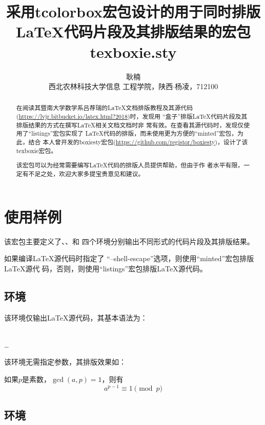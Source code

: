 \documentclass{ctexart}
\title{\Large \heiti 采用tcolorbox宏包设计的用于同时排版\LaTeX 代码片段及其排版结果的宏包texboxie.sty}
\author{\zihao{4} \fangsong 耿楠\\\small \songti 西北农林科技大学信息
  工程学院，陕西$\cdot$杨凌，712100}
\newcommand{\qtmark}[1]{``#1''}
\begin{document}

\maketitle

\begin{abstract}
  在阅读其暨南大学数学系吕荐瑞的\LaTeX 文档排版教程及其源代码
  (\url{https://lvjr.bitbucket.io/latex.html?2018})时，发现用
  \qtmark{盒子}排版\LaTeX 代码片段及其排版结果的方式在撰写\LaTeX 相关文档文档时非
  常有效。在查看其源代码时，发现仅使用了\qtmark{listings}宏包实现了
  \LaTeX 代码的排版，而未使用更为方便的\qtmark{minted}宏包，为此，结合
  本人曾开发的boxiesty宏包(\url{https://github.com/registor/boxiesty})，设计了该texboxie宏包。

  该宏包可以为经常需要编写\LaTeX 代码的排版人员提供帮助，但由于作
  者水平有限，一定有不足之处，欢迎大家多提宝贵意见和建议。
\end{abstract}

\section{使用样例}

该宏包主要定义了、、和
四个环境分别输出不同形式的代码片段及其排版结果。

如果编译\LaTeX 源代码时指定了
\qtmark{--shell-escape}选项，则使用\qtmark{minted}宏包排版\LaTeX 源代
码，否则，则使用\qtmark{listings}宏包排版\LaTeX 源代码。

\subsection{环境}

该环境仅输出\LaTeX 源代码，其基本语法为：

\begin{command}
 \\
\ldots \\
\end{command}

该环境无需指定参数，其排版效果如：

\begin{codeonly}
如果$p$是素数，$\gcd(a,p)=1$，则有
$$a^{p-1} \equiv 1 \pmod{p}$$
\end{codeonly}

\subsection{环境}
\end{document}
